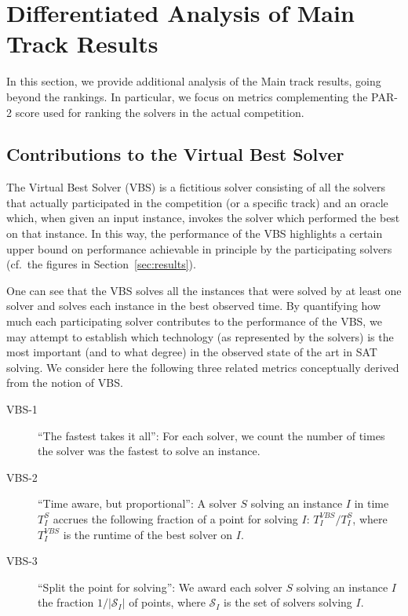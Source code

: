 \documentclass{elsarticle}
\begin{document}
\section{Differentiated Analysis of Main Track Results}
\label{sec:analysis}

In this section, we provide additional analysis of the Main track results, going beyond the rankings.
In particular, we focus on metrics complementing the PAR-2 score used for ranking the solvers in the actual competition.

\subsection{Contributions to the Virtual Best Solver}

\label{subsec:vbs_explained}

The Virtual Best Solver (VBS) is a fictitious solver consisting 
of all the solvers that actually participated in the competition (or a specific track)
and an oracle which, when given an input instance,
invokes  the  solver which performed the best on that instance.
In this way, the performance of the VBS highlights a certain upper bound 
on performance achievable in principle by the 
 participating solvers (cf.~the figures in Section~\ref{sec:results}). 

One can see that the VBS solves all the instances that
were solved by at least one solver and solves each instance in the best observed time.
By quantifying how much each participating solver contributes
to the performance of the VBS, we may attempt to establish which
technology (as represented by the solvers) is the most important
(and to what degree) in the observed state of the art in SAT solving.
We consider here the following three related metrics conceptually derived
from the notion of VBS.

\begin{description}
\item[VBS-1]
``The fastest takes it all'':
For each solver, we count the number of times the solver was the fastest to solve an instance.
\item[VBS-2]
``Time aware, but proportional'':
A solver $S$ solving an instance $I$ in time $T^S_I$ accrues 
the following fraction of a point for solving $I$:
$T^\mathit{VBS}_I/T^S_I$, where $T^\mathit{VBS}_I$ is the runtime of the best solver on $I$.
\item[VBS-3]
``Split the point for solving'':
We award each solver $S$ solving an instance $I$ the fraction $1/|\mathcal{S}_I|$ of points, where
$\mathcal{S}_I$ is the set of solvers solving $I$.
\end{description}
\end{document}
